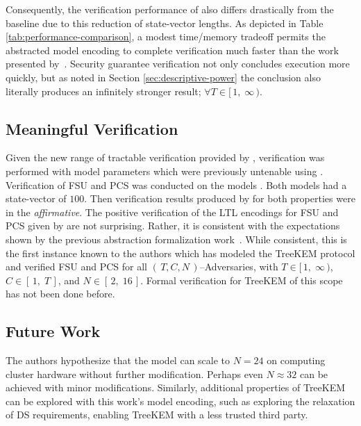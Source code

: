 \documentclass[runningheads]{llncs}
\newcommand{\Abrev}[1]{\gls{#1}}
\newcommand{\NumericRange}[2]{\ensuremath{\left[\,#1,\; #2\,\right]}\xspace}
\newcommand{\NumericRangeOpenR}[2]{\ensuremath{[\,#1,\; #2\,)}\xspace}
\begin{document}
Consequently, the verification performance of  also differs drastically from the baseline  due to this reduction of state-vector lengths.
As depicted in Table \ref{tab:performance-comparison}, a modest time/memory tradeoff permits the abstracted model encoding to complete verification much faster than the work presented by~\cite{washburn2022formal}.
Security guarantee verification not only concludes execution more quickly, but as noted in Section \ref{sec:descriptive-power} the conclusion also literally produces an infinitely stronger result; $\forall T \in \NumericRangeOpenR{1}{\infty}$.


\subsection{Meaningful Verification}

Given the new range of tractable verification provided by , verification was performed with model parameters which were previously untenable using . 
Verification of  \Abrev{FSU} and \Abrev{PCS} was conducted on the models .
Both models had a state-vector of $100$\siBytes.
Then verification results produced by   for both properties were in the \emph{affirmative}.
The positive verification of the LTL encodings for \Abrev{FSU} and \Abrev{PCS} given by  are not surprising.
Rather, it is consistent with the expectations shown by the previous \CGKAdef abstraction formalization work~\cite{alwen2020security}.
While consistent, this is the first instance known to the authors which has modeled the TreeKEM protocol and verified \Abrev{FSU} and \Abrev{PCS} for all $(\,T, C, N\,)$--Adversaries, with $T \in \NumericRangeOpenR{1}{\infty}$, $C \in \NumericRange{1}{T}$, and $N \in \NumericRange{2}{16}$.
Formal verification for TreeKEM of this scope has not been done before.


\subsection{Future Work}

The authors hypothesize that the model   can scale to $N = 24$ on computing cluster hardware without further modification.
Perhaps even $N \approx 32$ can be achieved with minor modifications.
Similarly, additional properties of TreeKEM can be explored with this work's model encoding, such as exploring the relaxation of  \Abrev{DS} requirements, enabling TreeKEM with a less trusted third party.
\end{document}

